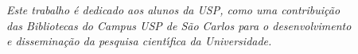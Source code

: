 \begin{dedicatoria}
   \vspace*{\fill}
   \centering
   \noindent
   \textit{ Este trabalho \'e dedicado aos alunos da USP, como uma contribui\c{c}\~ao\\
  das Bibliotecas do Campus USP de S\~ao Carlos para o desenvolvimento\\
	e dissemina\c{c}\~ao da pesquisa cient\'{\i}fica da Universidade.} \vspace*{\fill}
\end{dedicatoria}
